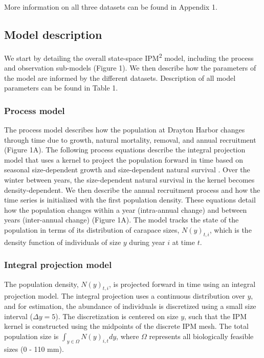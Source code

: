 \documentclass{article}
\begin{document}
More information on all three datasets can be found in Appendix 1. 

\subsection{Model description}

We start by detailing the overall state-space IPM\textsuperscript{2} model, including the process and observation sub-models (Figure 1). We then describe how the parameters of the model are informed by the different datasets. Description of all model parameters can be found in Table 1.

\subsubsection{Process model}

The process model describes how the population at Drayton Harbor changes through time due to growth, natural mortality, removal, and annual recruitment (Figure 1A). The following process equations describe the integral projection model that uses a kernel to project the population forward in time based on seasonal size-dependent growth and size-dependent natural survival \parencite{rees2014building}. Over the winter between years, the size-dependent natural survival in the kernel becomes density-dependent. We then describe the annual recruitment process and how the time series is initialized with the first population density. These equations detail how the population changes within a year (intra-annual change) and between years (inter-annual change) (Figure 1A). The model tracks the state of the population in terms of its distribution of carapace sizes, $N(y)_{t, i}$, which is the density function of individuals of size $y$ during year $i$ at time $t$. 

\subsubsection*{Integral projection model}

The population density, $N(y)_{t,i}$, is projected forward in time using an integral projection model. The integral projection uses a continuous distribution over $y$, and for estimation, the abundance of individuals is discretized using a small size interval ($\Delta y = 5$). The discretization is centered on size $y$, such that the IPM kernel is constructed using the midpoints of the discrete IPM mesh. The total population size is $\int_{y \in \Omega} N(y)_{i,t}dy$, where $\Omega$ represents all biologically feasible sizes (0 - 110 mm).
\end{document}
